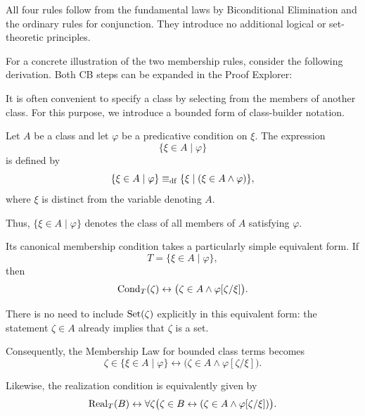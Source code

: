 All four rules follow from the fundamental laws by Biconditional Elimination and the ordinary rules for conjunction. They introduce no additional logical or set-theoretic principles.

For a concrete illustration of the two membership rules, consider the following derivation. Both CB steps can be expanded in the Proof Explorer:

\begin{formalderivation}
\begin{prooftree}
\end{prooftree}
\end{formalderivation}



It is often convenient to specify a class by selecting from the members of another class. For this purpose, we introduce a bounded form of class-builder notation.

\begin{definition}
\label{def:bounded-class-builder-notation}
Let \(A\) be a class and let \(\varphi\) be a predicative condition on \(\xi\). The expression
\[
\{\xi\in A\mid\varphi\}
\]
is defined by
\[
\{\xi\in A\mid\varphi\}
\mathrel{\equiv_{\mathrm{df}}}
\{\xi\mid(\xi\in A\land\varphi)\},
\]
where \(\xi\) is distinct from the variable denoting \(A\).
\end{definition}

Thus, \(\{\xi\in A\mid\varphi\}\) denotes the class of all members of \(A\) satisfying \(\varphi\).

Its canonical membership condition takes a particularly simple equivalent form. If
\[
T=\{\xi\in A\mid\varphi\},
\]
then
\[
\operatorname{Cond}_T(\zeta)
\leftrightarrow
\bigl(\zeta\in A\land\varphi[\zeta/\xi]\bigr).
\]

There is no need to include \(\operatorname{Set}(\zeta)\) explicitly in this equivalent form: the statement \(\zeta\in A\) already implies that \(\zeta\) is a set.

Consequently, the Membership Law for bounded class terms becomes
\[
\zeta\in\{\xi\in A\mid\varphi\}
\leftrightarrow
\bigl(
\zeta\in A\land\varphi[\zeta/\xi]
\bigr).
\]

Likewise, the realization condition is equivalently given by
\[
\operatorname{Real}_T(B)
\leftrightarrow
\forall\zeta
\bigl(
\zeta\in B
\leftrightarrow
(\zeta\in A\land\varphi[\zeta/\xi])
\bigr).
\]

